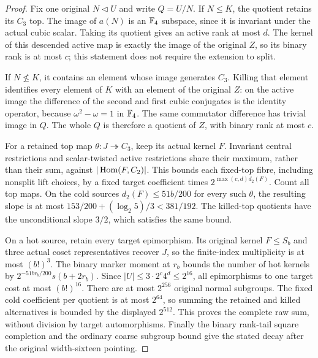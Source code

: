 \begin{proof}
Fix one original $N\lhd U$ and write $Q=U/N$. If $N\leq K$, the
quotient retains its $C_3$ top. The image of $a(N)$ is an $\mathbb F_4$
subspace, since it is invariant under the actual cubic scalar.
Taking its quotient gives an active rank at most $d$. The kernel
of this descended active map is exactly the image of the original
$Z$, so its binary rank is at most $c$; this statement does not
require the extension to split.

If $N\not\leq K$, it contains an element whose image generates
$C_3$. Killing that element identifies every element of $K$ with
an element of the original $Z$: on the active image the difference
of the second and first cubic conjugates is the identity operator,
because $\omega^2-\omega=1$ in $\mathbb F_4$. The same commutator difference
has trivial image in $Q$. The whole $Q$ is therefore a quotient of
$Z$, with binary rank at most $c$.

For a retained top map $\theta:J\twoheadrightarrow C_3$, keep its
actual kernel $F$. Invariant central restrictions and scalar-twisted
active restrictions share their maximum, rather than their sum,
against $|\operatorname{Hom}(F,C_2)|$. This bounds each fixed-top fibre, including
nonsplit lift choices, by a fixed target coefficient times
$2^{\max(c,d)d_2(F)}$. Count all top maps. On the cold sources
$d_2(F)\leq51b/200$ for every such $\theta$, the resulting slope is
at most $153/200+(\log_2 5)/3<381/192$. The killed-top quotients
have the unconditional slope $3/2$, which satisfies the same bound.

On a hot source, retain every target epimorphism. Its original
kernel $F\leq S_b$ and three actual coset representatives recover
$J$, so the finite-index multiplicity is at most $(b!)^3$.
The binary marker moment at $r_b$ bounds the number of hot kernels
by $2^{-51br_b/200}s(b+2r_b)$. Since
$|U|\leq3\cdot2^c4^d\leq2^{16}$, all epimorphisms to one target
cost at most $(b!)^{16}$. There are at most $2^{256}$ original
normal subgroups. The fixed cold coefficient per quotient is at
most $2^{64}$, so summing the retained and killed alternatives is
bounded by the displayed $2^{512}$. This proves the complete raw
sum, without division by target automorphisms. Finally the binary
rank-tail square completion and the ordinary coarse subgroup bound
give the stated decay after the original width-sixteen pointing.
\end{proof}

